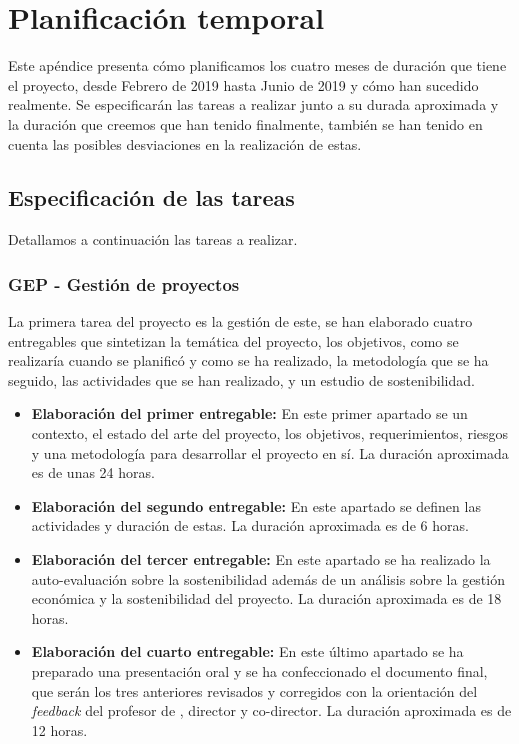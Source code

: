 \chapter{Planificación temporal}
\label{sec:planificacion}

Este apéndice presenta cómo planificamos los cuatro meses de duración que tiene el proyecto, desde Febrero de 2019 hasta Junio de 2019 y cómo han sucedido realmente. Se especificarán las tareas a realizar junto a su durada aproximada y la duración que creemos que han tenido finalmente, también se han tenido en cuenta las posibles desviaciones en la realización de estas.

\section{Especificación de las tareas}

Detallamos a continuación las tareas a realizar.

\subsection{GEP - Gestión de proyectos}

La primera tarea del proyecto es la gestión de este, se han elaborado cuatro entregables que sintetizan la temática del proyecto, los objetivos, como se realizaría cuando se planificó y como se ha realizado, la metodología que se ha seguido, las actividades que se han realizado, y un estudio de sostenibilidad.

\begin{itemize}
 \item \textbf{Elaboración del primer entregable:} En este primer apartado se  un contexto, el estado del arte del proyecto, los objetivos, requerimientos, riesgos y una metodología para desarrollar el proyecto en sí. La duración aproximada es de unas 24 horas.
 \item \textbf{Elaboración del segundo entregable:} En este apartado se definen las actividades y duración de estas. La duración aproximada es de 6 horas.
 \item \textbf{Elaboración del tercer entregable:} En este apartado se ha realizado la auto-evaluación sobre la sostenibilidad además de un análisis sobre la gestión económica y la sostenibilidad del proyecto. La duración aproximada es de 18 horas.
 \item \textbf{Elaboración del cuarto entregable:} En este último apartado se ha preparado una presentación oral y se ha confeccionado el documento final, que serán los tres anteriores revisados y corregidos con la orientación del \textit{feedback} del profesor de \textit{}, director y co-director. La duración aproximada es de 12 horas.
\end{itemize}

